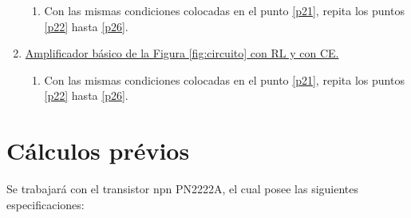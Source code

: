 \documentclass[10pt, a4paper]{article}
\begin{document}
\begin{enumerate}
        \begin{enumerate}
            \item Con las mismas condiciones colocadas en el punto \ref{p21}, repita los puntos \ref{p22} hasta \ref{p26}.
        \end{enumerate}
        \item \underline{Amplificador básico de la Figura \ref{fig:circuito} con RL y con CE.}
        \begin{enumerate}
            \item Con las mismas condiciones colocadas en el punto \ref{p21}, repita los puntos \ref{p22} hasta \ref{p26}.
        \end{enumerate}
    \end{enumerate}

    \newpage

    \section{Cálculos prévios}

    Se trabajará con el transistor npn PN2222A, el cual posee las siguientes especificaciones:

    
\end{document}
